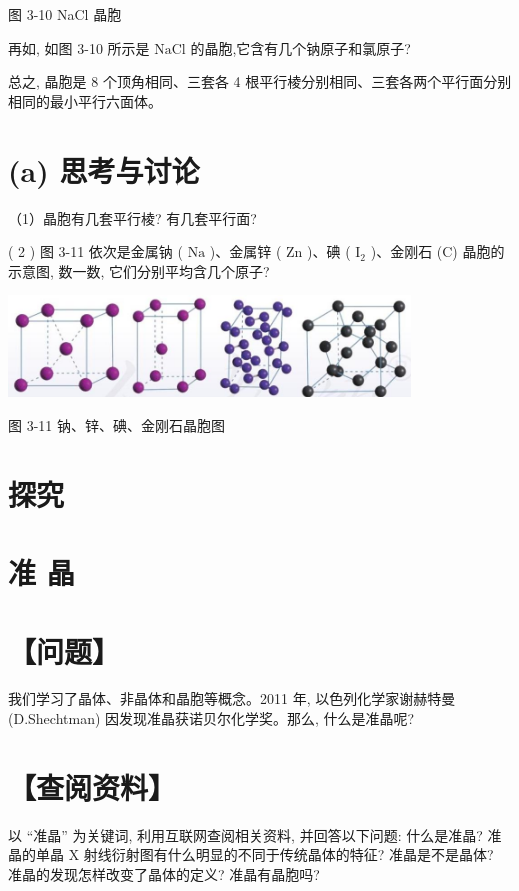 \documentclass[10pt]{article}
\begin{document}
图 3-10 NaCl 晶胞

再如, 如图 3-10 所示是 \(\mathrm{{NaCl}}\) 的晶胞,它含有几个钠原子和氯原子?

总之, 晶胞是 8 个顶角相同、三套各 4 根平行棱分别相同、三套各两个平行面分别相同的最小平行六面体。

\section*{(a) 思考与讨论}

（1）晶胞有几套平行棱? 有几套平行面?

( 2 ) 图 3-11 依次是金属钠 ( \(\mathrm{{Na}}\) )、金属锌 ( \(\mathrm{{Zn}}\) )、碘 ( \({\mathrm{I}}_{2}\) )、金刚石 (C) 晶胞的示意图, 数一数, 它们分别平均含几个原子?

\begin{center}
\includegraphics[max width=0.8\textwidth]{images/0190e026-5a11-7df7-bd27-54d09026ba7a_77_465562.jpg}
\end{center}

图 3-11 钠、锌、碘、金刚石晶胞图

\section*{探究}

\section*{准 晶}

\section*{【问题】}

我们学习了晶体、非晶体和晶胞等概念。2011 年, 以色列化学家谢赫特曼 (D.Shechtman) 因发现准晶获诺贝尔化学奖。那么, 什么是准晶呢?

\section*{【查阅资料】}

以 “准晶” 为关键词, 利用互联网查阅相关资料, 并回答以下问题: 什么是准晶? 准晶的单晶 \(\mathrm{X}\) 射线衍射图有什么明显的不同于传统晶体的特征? 准晶是不是晶体? 准晶的发现怎样改变了晶体的定义? 准晶有晶胞吗?
\end{document}
